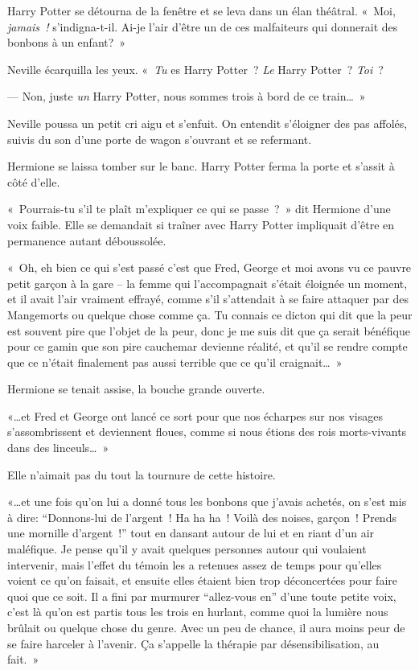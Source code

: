 Harry Potter se détourna de la fenêtre et se leva dans un élan théâtral. «~Moi, \emph{jamais~!} s'indigna-t-il.
Ai-je l'air d'être un de ces malfaiteurs qui donnerait des bonbons à un enfant?~»

Neville écarquilla les yeux.
«~\emph{Tu} es Harry Potter~? \emph{Le} Harry Potter~? \emph{Toi}~?

--- Non, juste \emph{un} Harry Potter, nous sommes trois à bord de ce train…~»

Neville poussa un petit cri aigu et s'enfuit.
On entendit s'éloigner des pas affolés, suivis du son d'une porte de wagon s'ouvrant et se refermant.

Hermione se laissa tomber sur le banc.
Harry Potter ferma la porte et s'assit à côté d'elle.

«~Pourrais-tu s'il te plaît m'expliquer ce qui se passe~?~» dit Hermione d'une voix faible.
Elle se demandait si traîner avec Harry Potter impliquait d'être en permanence autant déboussolée.

«~Oh, eh bien ce qui s'est passé c'est que Fred, George et moi avons vu ce pauvre petit garçon à la gare -- la femme qui l'accompagnait s'était éloignée un moment, et il avait l'air vraiment effrayé, comme s'il s'attendait à se faire attaquer par des Mangemorts ou quelque chose comme ça.
Tu connais ce dicton qui dit que la peur est souvent pire que l'objet de la peur, donc je me suis dit que ça serait bénéfique pour ce gamin que son pire cauchemar devienne réalité, et qu'il se rendre compte que ce n'était finalement pas aussi terrible que ce qu'il craignait…~»

Hermione se tenait assise, la bouche grande ouverte.

«…et Fred et George ont lancé ce sort pour que nos écharpes sur nos visages s'assombrissent et deviennent floues, comme si nous étions des rois morts-vivants dans des linceuls…~»

Elle n'aimait pas du tout la tournure de cette histoire.

«…et une fois qu'on lui a donné tous les bonbons que j'avais achetés, on s'est mis à dire: “Donnons-lui de l'argent~! Ha ha ha~! Voilà des noises, garçon~! Prends une mornille d'argent~!”
tout en dansant autour de lui et en riant d'un air maléfique.
Je pense qu'il y avait quelques personnes autour qui voulaient intervenir, mais l'effet du témoin les a retenues assez de temps pour qu'elles voient ce qu'on faisait, et ensuite elles étaient bien trop déconcertées pour faire quoi que ce soit.
Il a fini par murmurer “allez-vous en” d'une toute petite voix, c'est là qu'on est partis tous les trois en hurlant, comme quoi la lumière nous brûlait ou quelque chose du genre.
Avec un peu de chance, il aura moins peur de se faire harceler à l'avenir.
Ça s'appelle la thérapie par désensibilisation, au fait.~»

